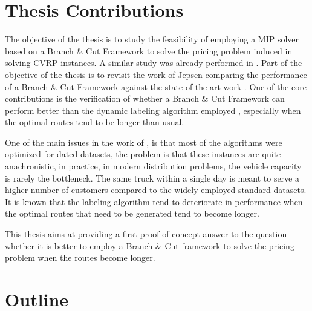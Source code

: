 \section{Thesis Contributions}
The objective of the thesis is to study the feasibility of employing a MIP solver
based on a Branch \& Cut Framework to solve the pricing problem induced in solving
CVRP instances.
A similar study was already performed in \cite{Jepsen2014}.
Part of the objective of the thesis is to revisit the work of Jepsen comparing
the performance of a Branch \& Cut Framework against the state of the art work
\cite{pessoa2020generic}.
One of the core contributions is the verification of whether a Branch \& Cut Framework
can perform better than the dynamic labeling algorithm employed \cite{pessoa2020generic},
especially when the optimal routes tend to be longer than usual.

One of the main issues in the work of \cite{pessoa2020generic}, is that
most of the algorithms were optimized for dated datasets, the problem
is that these instances are quite anachronistic, in practice, in modern
distribution problems, the vehicle capacity is rarely the bottleneck.
The same truck within a single day is meant to serve a higher number of customers
compared to the widely employed standard datasets.
It is known that the labeling algorithm tend to deteriorate in performance when
the optimal routes that need to be generated tend to become longer.

This thesis aims at providing a first proof-of-concept answer to the question
whether it is better to employ a Branch \& Cut framework to solve the pricing problem
when the routes become longer.


\section{Outline}
